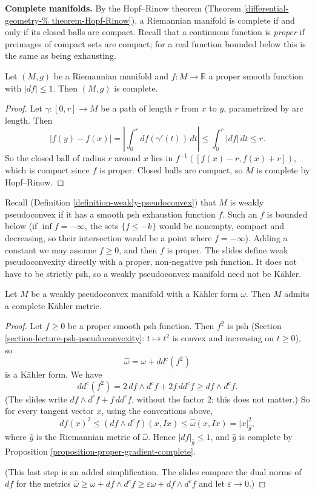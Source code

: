 \medskip\noindent
{\bf Complete manifolds.} By the Hopf--Rinow
theorem (Theorem
\ref{differential-geometry-%
theorem-Hopf-Rinow}),
a Riemannian manifold is complete if and only
if its closed balls are compact. Recall that
a continuous function is \emph{proper} if
preimages of compact sets are compact; for a
real function bounded below this is the same
as being exhausting.

\begin{proposition}
\label{proposition-proper-gradient-complete}
Let $(M,g)$ be a Riemannian manifold and
$f\colon M\to\mathbb{R}$ a proper smooth
function with $|df|\leq 1$. Then $(M,g)$ is
complete.
\end{proposition}

\begin{proof}
Let $\gamma\colon[0,r]\to M$ be a path of
length $r$ from $x$ to $y$, parametrized by
arc length. Then
$$
|f(y)-f(x)|=\left|\int_0^r df(\gamma'(t))\,dt
\right|\leq\int_0^r|df|\,dt\leq r .
$$
So the closed ball of radius $r$ around $x$
lies in $f^{-1}([f(x)-r,f(x)+r])$, which is
compact since $f$ is proper. Closed balls are
compact, so $M$ is complete by Hopf--Rinow.
\end{proof}

\noindent
Recall (Definition
\ref{definition-weakly-pseudoconvex}) that
$M$ is weakly pseudoconvex if it has a smooth
psh exhaustion function $f$. Such an $f$ is
bounded below (if $\inf f=-\infty$, the sets
$\{f\leq -k\}$ would be nonempty, compact and
decreasing, so their intersection would be a
point where $f=-\infty$). Adding a constant
we may assume $f\geq0$, and then $f$ is
proper. The slides define weak
pseudoconvexity directly with a proper,
non-negative psh function. It does not have
to be strictly psh, so a weakly pseudoconvex
manifold need not be K\"ahler.

\begin{proposition}
\label{proposition-wpc-kahler-complete}
Let $M$ be a weakly pseudoconvex manifold
with a K\"ahler form $\omega$. Then $M$
admits a complete K\"ahler metric.
\end{proposition}

\begin{proof}
Let $f\geq0$ be a proper smooth psh function.
Then $f^2$ is psh (Section
\ref{section-lecture-psh-pseudoconvexity}:
$t\mapsto t^2$ is convex and increasing on
$t\geq0$), so
$$
\hat\omega=\omega+dd^c(f^2)
$$
is a K\"ahler form. We have
$$
dd^c(f^2)=2\,df\wedge d^cf+2f\,dd^cf\geq df
\wedge d^cf .
$$
(The slides write $df\wedge d^cf+f\,dd^cf$,
without the factor $2$; this does not
matter.) So for every tangent vector $x$,
using the conventions above,
$$
df(x)^2\leq(df\wedge d^cf)(x,Ix)
\leq\hat\omega(x,Ix)=|x|^2_{\hat g},
$$
where $\hat g$ is the Riemannian metric of
$\hat\omega$. Hence $|df|_{\hat g}\leq1$, and
$\hat g$ is complete by Proposition
\ref{proposition-proper-gradient-complete}.

(This last step is an added simplification.
The
slides compare the dual norms of $df$ for the
metrics $\hat\omega\geq\omega+df\wedge
d^cf\geq\varepsilon\omega+df\wedge d^cf$ and
let $\varepsilon\to0$.)
\end{proof}

